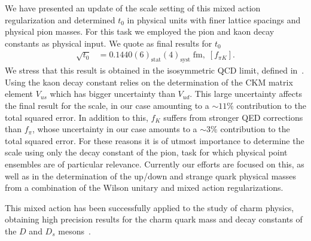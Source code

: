 We have presented an update of the scale setting of this mixed action regularization and determined $t_0$ in physical units with finer lattice spacings and physical pion masses. For this task we employed the pion and kaon decay constants as physical input. We quote as final results for $t_0$
\begin{align}
\sqrt{t_0}&=0.1440(6)_{\textrm{stat}}(4)_{\textrm{syst}}\;\textrm{fm},\;[f_{\pi K}].
\end{align}
We stress that this result is obtained in the isosymmetric QCD limit, defined in~\citep{FlavourLatticeAveragingGroupFLAG:2021npn}. Using the kaon decay constant relies on the determination of the CKM matrix element $V_{us}$ which has bigger uncertainty than $V_{ud}$. This large uncertainty affects the final result for the scale, in our case amounting to a $\sim11\%$ contribution to the total squared error. In addition to this, $f_K$ suffers from stronger QED corrections than $f_{\pi}$, whose uncertainty in our case amounts to a $\sim3\%$ contribution to the total squared error. For these reasons it is of utmost importance to determine the scale using only the decay constant of the pion, task for which physical point ensembles are of particular relevance. Currently our efforts are focused on this, as well as in the determination of the up/down and strange quark physical masses from a combination of the Wilson unitary and mixed action regularizations.

This mixed action has been successfully applied to the study of charm physics, obtaining high precision results for the charm quark mass and decay constants of the $D$ and $D_s$ mesons~\citep{charm}.

